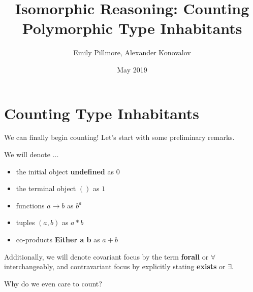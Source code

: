 \documentclass[tikz]{beamer}
\title{Isomorphic Reasoning: Counting Polymorphic Type Inhabitants}
\author{Emily Pillmore, Alexander Konovalov}
\date{May 2019}
\theoremstyle{definition}
\begin{document}
\section{Counting Type Inhabitants}

\begin{frame}

We can finally begin counting! Let's start with some preliminary remarks.
\end{frame}

\begin{frame}

We will denote $\ldots$

\begin{itemize}
	\item the initial object  \textbf{undefined} as $0$
	\item the terminal object $()$ as $1$
	\item functions $a \to b$ as $b^a$
	\item tuples $(a, b)$ as $a * b$
	\item co-products \textbf{Either a b} as $a + b$
\end{itemize}

Additionally, we will denote covariant focus by the term \textbf{forall} or $\forall$ interchangeably, and contravariant focus by explicitly stating \textbf{exists} or $\exists$.
\end{frame}

\begin{frame}
Why do we even care to count?
\end{frame}
\end{document}
